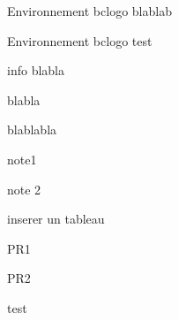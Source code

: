 \documentclass[12pt, twoside, openright, french]{book}
\begin{document}
\begin{Methode}[~s ou info]
Environnement bclogo
blablab
\end{Methode}

\begin{Rmq}[~s ou titre]
Environnement bclogo
test
\end{Rmq}

\begin{Crayon}[Titre]{info}
blabla
\end{Crayon}

\begin{objectifs}

\item blabla
\item blablabla

\end{objectifs}

\medskip

\begin{enligne}
\item note1
\item note 2
\end{enligne}

\medskip

\begin{surEuler}
inserer un tableau
\end{surEuler}

\medskip

\begin{prerequis}
\item PR1
\item PR2
\end{prerequis}

\begin{Exercice}
test
\end{Exercice}

\setcounter{exos}{10}
\begin{Exercice}

\end{Exercice}

\begin{Exo}[A]

\end{Exo}




\end{document}

